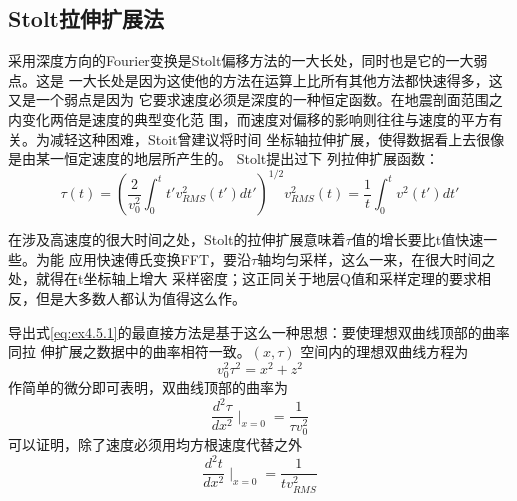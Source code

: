 \subsection{Stolt拉伸扩展法}
\label{sec:4.5.4}

采用深度方向的Fourier变换是Stolt偏移方法的一大长处，同时也是它的一大弱点。这是
一大长处是因为这使他的方法在运算上比所有其他方法都快速得多，这又是一个弱点是因为
它要求速度必须是深度的一种恒定函数。在地震剖面范围之内变化两倍是速度的典型变化范
围，而速度对偏移的影响则往往与速度的平方有关。为减轻这种困难，Stoit曾建议将时间
坐标轴拉伸扩展，使得数据看上去很像是由某一恒定速度的地层所产生的。
Stolt提出过下 列拉伸扩展函数：
\begin{subequations}
\begin{equation}
\tau(t)=(\frac{2}{v_0^2}\int_0^t t'v_{RMS}^2(t')dt')^{1/2}
\label{eq:ex4.5.1a}
\end{equation}
\begin{equation}
v_{RMS}^2(t)=\frac{1}{t}\int_0^t v^2(t')dt'
\label{eq:ex4.5.1b}
\end{equation}
\label{eq:ex4.5.1}
\end{subequations}

在涉及高速度的很大时间之处，Stolt的拉伸扩展意味着$\tau$值的增长要比t值快速一些。为能
应用快速傅氏变换FFT，要沿$\tau$轴均匀采样，这么一来，在很大时间之处，就得在t坐标轴上增大
采样密度；这正同关于地层Q值和采样定理的要求相反，但是大多数人都认为值得这么作。

导出式\ref{eq:ex4.5.1}的最直接方法是基于这么一种思想：要使理想双曲线顶部的曲率同拉
伸扩展之数据中的曲率相符一致。$(x,\tau)$ 空间内的理想双曲线方程为
\begin{equation}
v_0^2\tau^2=x^2+z^2
\label{eq:ex4.5.2}
\end{equation}
作简单的微分即可表明，双曲线顶部的曲率为
\begin{equation}
\frac{d^2\tau}{dx^2}\mid_{x=0}=\frac{1}{\tau v_0^2}
\label{eq:ex4.5.3}
\end{equation}
可以证明，除了速度必须用均方根速度代替之外
\begin{equation}
\frac{d^2 t}{dx^2}\mid_{x=0}=\frac{1}{tv_{RMS}^2}
\label{eq:ex4.5.4}
\end{equation}




